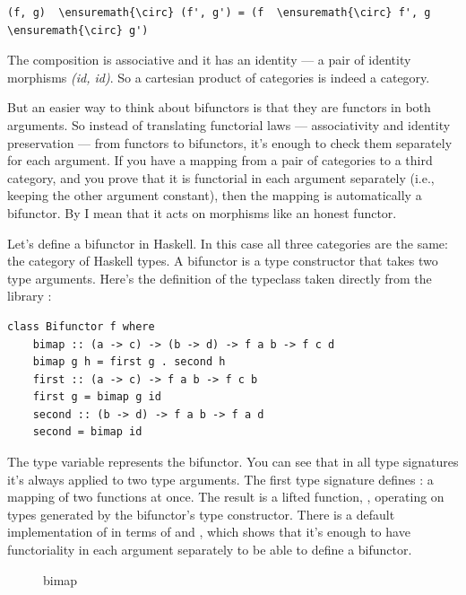 \begin{Verbatim}[commandchars=\\\{\}]
(f, g)  \ensuremath{\circ} (f', g') = (f  \ensuremath{\circ} f', g  \ensuremath{\circ} g')
\end{Verbatim}
The composition is associative and it has an identity --- a pair of
identity morphisms \emph{(id, id)}. So a cartesian product of categories
is indeed a category.

But an easier way to think about bifunctors is that they are functors in
both arguments. So instead of translating functorial laws ---
associativity and identity preservation --- from functors to bifunctors,
it's enough to check them separately for each argument. If you have a
mapping from a pair of categories to a third category, and you prove
that it is functorial in each argument separately (i.e., keeping the
other argument constant), then the mapping is automatically a bifunctor.
By  I mean that it acts on morphisms like an honest
functor.

Let's define a bifunctor in Haskell. In this case all three categories
are the same: the category of Haskell types. A bifunctor is a type
constructor that takes two type arguments. Here's the definition of the
 typeclass taken directly from the library
:

\begin{Verbatim}[commandchars=\\\{\}]
class Bifunctor f where 
    bimap :: (a -> c) -> (b -> d) -> f a b -> f c d
    bimap g h = first g . second h
    first :: (a -> c) -> f a b -> f c b
    first g = bimap g id
    second :: (b -> d) -> f a b -> f a d
    second = bimap id
\end{Verbatim}
The type variable  represents the bifunctor. You can see that
in all type signatures it's always applied to two type arguments. The
first type signature defines : a mapping of two functions
at once. The result is a lifted function,
, operating on types
generated by the bifunctor's type constructor. There is a default
implementation of  in terms of  and
, which shows that it's enough to have functoriality in
each argument separately to be able to define a bifunctor.

\begin{figure}[H]
\centering
{}
\caption{bimap}
\end{figure}

